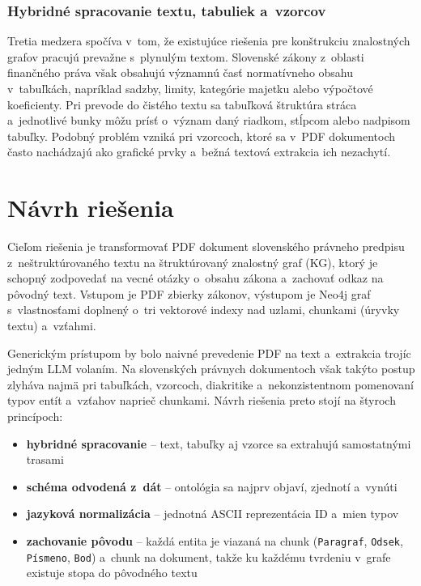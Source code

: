 \subsubsection{Hybridné spracovanie textu, tabuliek a~vzorcov}
Tretia medzera spočíva v~tom, že existujúce riešenia pre konštrukciu znalostných grafov pracujú prevažne s~plynulým textom. Slovenské zákony z~oblasti finančného práva však obsahujú významnú časť normatívneho obsahu v~tabuľkách, napríklad sadzby, limity, kategórie majetku alebo výpočtové koeficienty. Pri prevode do čistého textu sa tabuľková štruktúra stráca a~jednotlivé bunky môžu prísť o~význam daný riadkom, stĺpcom alebo nadpisom tabuľky. Podobný problém vzniká pri vzorcoch, ktoré sa v~PDF dokumentoch často nachádzajú ako grafické prvky a~bežná textová extrakcia ich nezachytí.




\section{Návrh riešenia}\label{sec:navrh}

Cieľom riešenia je transformovať PDF dokument slovenského právneho predpisu z~neštruktúrovaného textu na štruktúrovaný znalostný graf (KG), ktorý je schopný zodpovedať na vecné otázky o~obsahu zákona a~zachovať odkaz na pôvodný text. Vstupom je PDF zbierky zákonov, výstupom je Neo4j graf s~vlastnosťami doplnený o~tri vektorové indexy nad uzlami, chunkami (úryvky textu) a~vzťahmi.

Generickým prístupom by bolo naivné prevedenie PDF na text a~extrakcia trojíc jedným LLM volaním. Na slovenských právnych dokumentoch však takýto postup zlyháva najmä pri tabuľkách, vzorcoch, diakritike a~nekonzistentnom pomenovaní typov entít a~vzťahov naprieč chunkami. Návrh riešenia preto stojí na štyroch princípoch: 

\begin{itemize}
  \item \textbf{hybridné spracovanie} – text, tabuľky aj vzorce sa extrahujú samostatnými trasami
  \item \textbf{schéma odvodená z~dát} – ontológia sa najprv objaví, zjednotí a~vynúti
  \item \textbf{jazyková normalizácia} – jednotná ASCII reprezentácia ID a~mien typov
  \item \textbf{zachovanie pôvodu} – každá entita je viazaná na chunk (\texttt{Paragraf}, \texttt{Odsek}, \texttt{Písmeno}, \texttt{Bod}) a~chunk na dokument, takže ku každému tvrdeniu v~grafe existuje stopa do pôvodného textu
\end{itemize}

